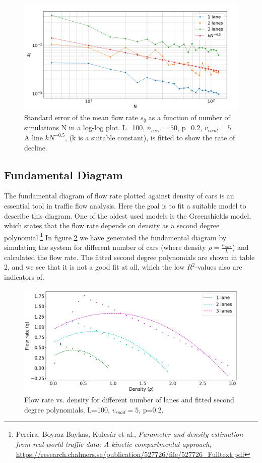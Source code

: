 \documentclass[a4paper,12pt]{article}
\begin{document}
\begin{figure}[H]
	 \centering
        \includegraphics[scale=0.4]{fig6.png}
         \caption{Standard error of the mean flow rate $s_{\bar{q}}$ as a function of number of simulations N in a log-log plot. L=100, $n_{cars}=50$, p=0.2, $v_{road}=5$. A line $kN^{-0.5}$, (k is a suitable constant), is fitted to show the rate of decline.}
    \label{semq}
\end{figure}

\subsection{Fundamental Diagram}
The fundamental diagram of flow rate plotted against density of cars is an essential tool in traffic flow analysis. Here the goal is to fit a suitable model to describe this diagram. One of the oldest used models is the Greenshields model, which states that the flow rate depends on density as a second degree polynomial.\footnote{Pereira, Boyraz Baykas, Kulcsár et al., \textit{Parameter and density estimation from real-world traffic data: A kinetic compartmental approach}, \url{https://research.chalmers.se/publication/527726/file/527726_Fulltext.pdf}} In figure \ref{fig3} we have generated the fundamental diagram by simulating the system for different number of cars (where density $\rho = \frac{n_{cars}}{L}$) and calculated the flow rate. The fitted second degree polynomials are shown in table 2, and we see that it is not a good fit at all, which the low $R^2$-values also are indicators of.\\

\begin{figure}[H]
	\centering
        \includegraphics[scale=0.45]{fig3.png}
    \caption{Flow rate vs. density for different number of lanes and fitted second degree polynomials, L=100, $v_{road}=5$, p=0.2.}
    \label{fig3}
\end{figure}
\end{document}
